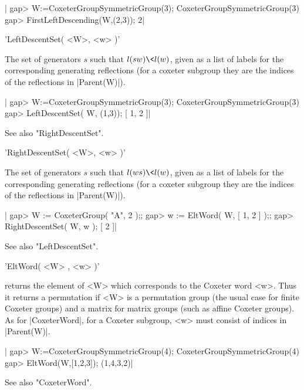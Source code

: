 |    gap> W:=CoxeterGroupSymmetricGroup(3);
    CoxeterGroupSymmetricGroup(3)
    gap> FirstLeftDescending(W,(2,3));
    2|


'LeftDescentSet( <W>, <w> )'

The  set of  generators $s$  such that  $l(sw)\<l(w)$, given  as a  list of
labels for the corresponding generating reflections (for a coxeter subgroup
they are the indices of the reflections in |Parent(W)|).

|    gap> W:=CoxeterGroupSymmetricGroup(3);
    CoxeterGroupSymmetricGroup(3)
    gap> LeftDescentSet( W, (1,3));
    [ 1, 2 ]|

See also "RightDescentSet".


'RightDescentSet( <W>, <w> )'

The  set of  generators $s$  such that  $l(ws)\< l(w)$,  given as a list of
labels for the corresponding generating reflections (for a coxeter subgroup
they are the indices of the reflections in |Parent(W)|).

|    gap> W := CoxeterGroup( "A", 2 );;
    gap> w := EltWord( W, [ 1, 2 ] );;
    gap> RightDescentSet( W, w );
    [ 2 ]|

See also "LeftDescentSet".



'EltWord( <W> , <w> )'

returns  the element of <W> which corresponds to the Coxeter word <w>. Thus
it  returns a permutation if <W> is a permutation group (the usual case for
finite  Coxeter  groups)  and  a  matrix  for matrix groups (such as affine
Coxeter  groups). As  for |CoxeterWord|,  for a  Coxeter subgroup, <w> must
consist of indices in |Parent(W)|.

|    gap> W:=CoxeterGroupSymmetricGroup(4);
    CoxeterGroupSymmetricGroup(4)
    gap> EltWord(W,[1,2,3]);
    (1,4,3,2)|

See also "CoxeterWord".


